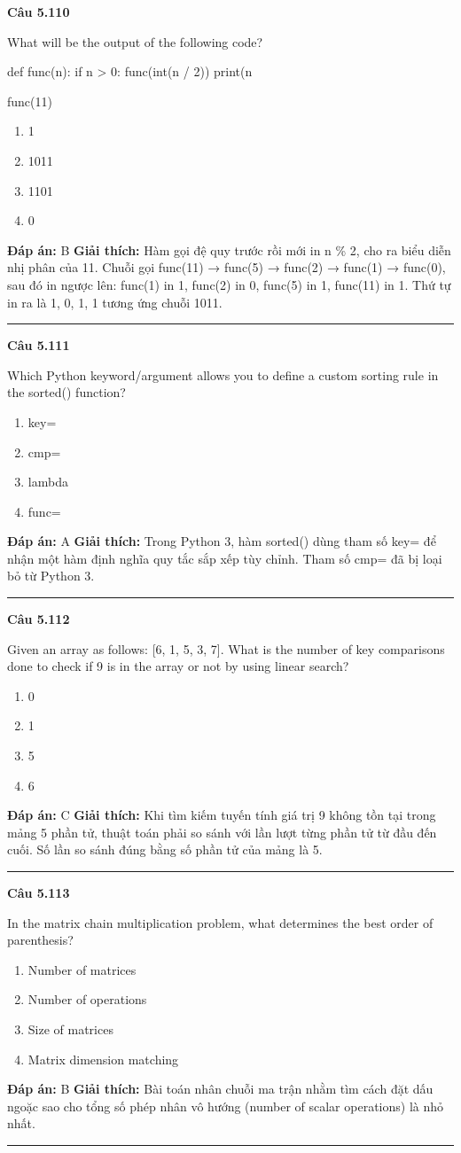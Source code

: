 \documentclass[11pt,a4paper]{article}
\newenvironment{question}[1]{%
  \par\vspace{1em}\noindent\textbf{\large Câu #1}\par\vspace{0.4em}
}{%
  \par\vspace{1em}\hrule\vspace{0.6em}
}
\newenvironment{choices}{%
  \begin{enumerate}[label=\textbf{\Alph*.},leftmargin=2.2em,itemsep=2pt,topsep=3pt]
}{%
  \end{enumerate}
}
\newcommand{\choice}{\item}
\newenvironment{codebox}{%
  \begin{tcolorbox}[colback=gray!8!white,colframe=gray!50!black,arc=1.5mm,boxrule=0.6pt,left=3mm,right=3mm,top=2.5mm,bottom=2.5mm]
  \ttfamily\small
}{%
  \end{tcolorbox}
}
\begin{document}
\begin{question}{5.110}
What will be the output of the following code?
\begin{codebox}
def func(n):
    if n > 0:
        func(int(n / 2))
        print(n %

func(11)
\end{codebox}
\begin{choices}
\choice 1
\choice 1011
\choice 1101
\choice 0
\end{choices}
\textbf{Đáp án:} B
\textbf{Giải thích:} Hàm gọi đệ quy trước rồi mới in n \% 2, cho ra biểu diễn nhị phân của 11. Chuỗi gọi func(11) → func(5) → func(2) → func(1) → func(0), sau đó in ngược lên: func(1) in 1, func(2) in 0, func(5) in 1, func(11) in 1. Thứ tự in ra là 1, 0, 1, 1 tương ứng chuỗi 1011.
\end{question}

\begin{question}{5.111}
Which Python keyword/argument allows you to define a custom sorting rule in the sorted() function?
\begin{choices}
\choice key=
\choice cmp=
\choice lambda
\choice func=
\end{choices}
\textbf{Đáp án:} A
\textbf{Giải thích:} Trong Python 3, hàm sorted() dùng tham số key= để nhận một hàm định nghĩa quy tắc sắp xếp tùy chỉnh. Tham số cmp= đã bị loại bỏ từ Python 3.
\end{question}

\begin{question}{5.112}
Given an array as follows: [6, 1, 5, 3, 7]. What is the number of key comparisons done to check if 9 is in the array or not by using linear search?
\begin{choices}
\choice 0
\choice 1
\choice 5
\choice 6
\end{choices}
\textbf{Đáp án:} C
\textbf{Giải thích:} Khi tìm kiếm tuyến tính giá trị 9 không tồn tại trong mảng 5 phần tử, thuật toán phải so sánh với lần lượt từng phần tử từ đầu đến cuối. Số lần so sánh đúng bằng số phần tử của mảng là 5.
\end{question}

\begin{question}{5.113}
In the matrix chain multiplication problem, what determines the best order of parenthesis?
\begin{choices}
\choice Number of matrices
\choice Number of operations
\choice Size of matrices
\choice Matrix dimension matching
\end{choices}
\textbf{Đáp án:} B
\textbf{Giải thích:} Bài toán nhân chuỗi ma trận nhằm tìm cách đặt dấu ngoặc sao cho tổng số phép nhân vô hướng (number of scalar operations) là nhỏ nhất.
\end{question}
\end{document}
